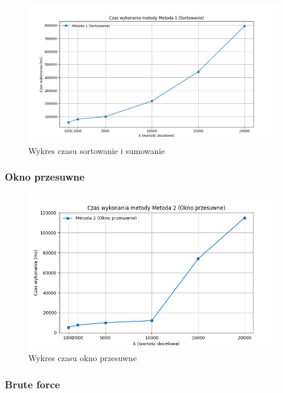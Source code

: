 \documentclass[12pt,twoside]{article}
\begin{document}
\begin{figure}[!h]
    \centering
    \includegraphics[width=1\linewidth]{wykres_1.png}
    \caption{Wykres czasu sortowanie i sumowanie}
    \label{fig:enter-label}
\end{figure}
\clearpage
\subsubsection{Okno przesuwne}

\begin{figure}[!h]
    \centering
    \includegraphics[width=1\linewidth]{wykres_2.png}
    \caption{Wykres czasu okno przesuwne}
    \label{fig:enter-label}
\end{figure}
\clearpage
\subsubsection{Brute force}
\end{document}
